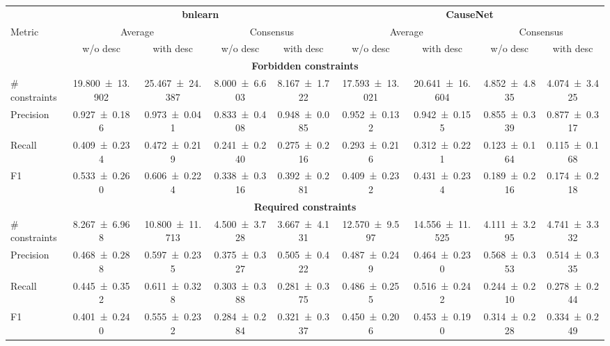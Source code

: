 \begin{tabular}{lcccccccc}
\toprule
 & \multicolumn{4}{c}{\textbf{bnlearn}} & \multicolumn{4}{c}{\textbf{CauseNet}} \\
\cmidrule(lr){2-5} \cmidrule(lr){6-9}
Metric & \multicolumn{2}{c}{Average} & \multicolumn{2}{c}{Consensus} & \multicolumn{2}{c}{Average} & \multicolumn{2}{c}{Consensus} \\
\cmidrule(lr){2-3} \cmidrule(lr){4-5} \cmidrule(lr){6-7} \cmidrule(lr){8-9}
 & w/o desc & with desc & w/o desc & with desc & w/o desc & with desc & w/o desc & with desc \\
\midrule
\multicolumn{9}{c}{\textbf{Forbidden constraints}} \\
\midrule
# constraints & \num{19.800+-13.902} & \num{25.467+-24.387} & \num{8.000+-6.603} & \num{8.167+-1.722} & \num{17.593+-13.021} & \num{20.641+-16.604} & \num{4.852+-4.835} & \num{4.074+-3.425} \\
Precision & \num{0.927+-0.186} & \num{0.973+-0.041} & \num{0.833+-0.408} & \num{0.948+-0.085} & \num{0.952+-0.132} & \num{0.942+-0.155} & \num{0.855+-0.339} & \num{0.877+-0.317} \\
Recall & \num{0.409+-0.234} & \num{0.472+-0.219} & \num{0.241+-0.240} & \num{0.275+-0.216} & \num{0.293+-0.216} & \num{0.312+-0.221} & \num{0.123+-0.164} & \num{0.115+-0.168} \\
F1 & \num{0.533+-0.260} & \num{0.606+-0.224} & \num{0.338+-0.316} & \num{0.392+-0.281} & \num{0.409+-0.232} & \num{0.431+-0.234} & \num{0.189+-0.216} & \num{0.174+-0.218} \\
\multicolumn{9}{c}{\textbf{Required constraints}} \\
\midrule
# constraints & \num{8.267+-6.968} & \num{10.800+-11.713} & \num{4.500+-3.728} & \num{3.667+-4.131} & \num{12.570+-9.597} & \num{14.556+-11.525} & \num{4.111+-3.295} & \num{4.741+-3.332} \\
Precision & \num{0.468+-0.288} & \num{0.597+-0.235} & \num{0.375+-0.327} & \num{0.505+-0.422} & \num{0.487+-0.249} & \num{0.464+-0.230} & \num{0.568+-0.353} & \num{0.514+-0.335} \\
Recall & \num{0.445+-0.352} & \num{0.611+-0.328} & \num{0.303+-0.388} & \num{0.281+-0.375} & \num{0.486+-0.255} & \num{0.516+-0.242} & \num{0.244+-0.210} & \num{0.278+-0.244} \\
F1 & \num{0.401+-0.240} & \num{0.555+-0.232} & \num{0.284+-0.284} & \num{0.321+-0.337} & \num{0.450+-0.206} & \num{0.453+-0.190} & \num{0.314+-0.228} & \num{0.334+-0.249} \\
\bottomrule
\end{tabular}
